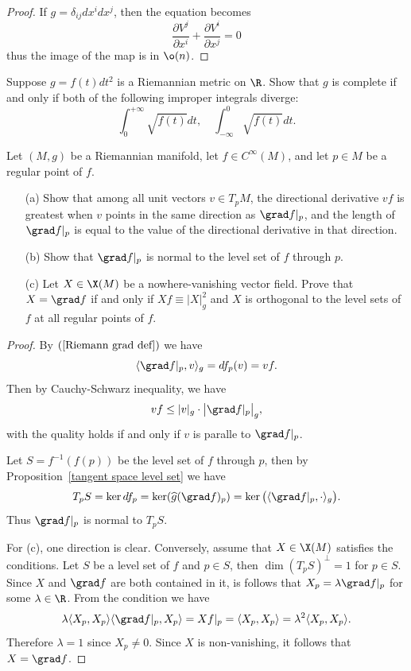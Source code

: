 \begin{proof}
If $g=\delta_{ij}dx^idx^j$, then the equation becomes
\[\frac{\partial V^j}{\partial x^i}+\frac{\partial V^i}{\partial x^j}=0\]
thus the image of the map is in $\o(n)$.
\end{proof}
\begin{exercise}
Suppose $g=f(t)dt^2$ is a Riemannian metric on $\R$. Show that $g$ is complete if and only if both of the following improper integrals diverge:
\[\int_{0}^{+\infty}\sqrt{f(t)}dt,\quad\int_{-\infty}^{0}\sqrt{f(t)}dt.\]
\end{exercise}
\begin{exercise}\label{Riemann grad prop}
Let $(M,g)$ be a Riemannian manifold, let $f\in C^\infty(M)$, and let $p\in M$ be a regular point of $f$.
\begin{itemize}
\item[(a)] Show that among all unit vectors $v\in T_pM$, the directional derivative
$vf$ is greatest when $v$ points in the same direction as $\grad f|_p$, and the length of $\grad f|_p$ is equal to the value of the directional derivative in that direction.
\item[(b)] Show that $\grad f|_p$ is normal to the level set of $f$ through $p$.
\item[(c)] Let $X\in\X(M)$ be a nowhere-vanishing vector field. Prove that $X=\grad f$ if and only if $Xf\equiv|X|_g^2$ and $X$ is orthogonal to the level sets of $f$ 
at all regular points of $f$. 
\end{itemize}
\end{exercise}
\begin{proof}
By $(\ref{Riemann grad def})$ we have
\[\langle\grad f|_p,v\rangle_g=df_p(v)=vf.\]
Then by Cauchy-Schwarz inequality, we have
\[vf\leq |v|_g\cdot\big|\grad f|_p\big|_g,\]
with the quality holds if and only if $v$ is paralle to $\grad f|_p$.\par
Let $S=f^{-1}(f(p))$ be the level set of $f$ through $p$, then by Proposition~\ref{tangent space level set} we have
\[T_pS=\ker df_p=\ker(\widehat{g}(\grad f)_p)=\ker\big(\langle\grad f|_p,\cdot\rangle_g\big).\]
Thus $\grad f|_p$ is normal to $T_pS$.\par
For (c), one direction is clear. Conversely, assume that $X\in\X(M)$ satisfies the conditions. Let $S$ be a level set of $f$ and $p\in S$, then $\dim(T_pS)^{\bot}=1$ 
for $p\in S$. Since $X$ and $\grad f$ are both contained in it, is follows that $X_p=\lambda\grad f|_p$ for some $\lambda\in\R$. From the condition we have
\[\lambda\langle X_p,X_p\rangle\langle\grad f|_p,X_p\rangle=Xf|_p=\langle X_p,X_p\rangle=\lambda^2\langle X_p,X_p\rangle.\]
Therefore $\lambda=1$ since $X_p\neq 0$. Since $X$ is non-vanishing, it follows that $X=\grad f$.
\end{proof}
